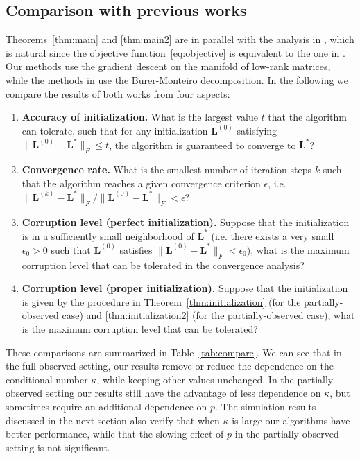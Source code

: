 \documentclass[12pt]{article}
\newcommand{\bL}{\boldsymbol{L}}
\theoremstyle{plain}
\theoremstyle{definition}
\theoremstyle{plain}
\theoremstyle{plain}
\theoremstyle{remark}
\begin{document}


\subsection{Comparison with previous works}\label{sec:compare}
Theorems~\ref{thm:main} and \ref{thm:main2} are in parallel with the analysis in \cite{DBLP:conf/nips/YiPCC16}, which is natural since the objective function~\eqref{eq:objective} is equivalent to the one in \cite{DBLP:conf/nips/YiPCC16}. Our methods use the gradient descent on the manifold of low-rank matrices, while the methods in \cite{DBLP:conf/nips/YiPCC16} use the Burer-Monteiro decomposition. In the following we compare the results of both works from four aspects: 
\begin{enumerate}

\item \textbf{Accuracy of initialization.} What is the largest value $t$ that the algorithm can tolerate, such that for any initialization $\bL^{(0)}$ satisfying $\|\bL^{(0)}-\bL^*\|_F\leq t$, the algorithm is guaranteed to converge to $\bL^*$? 

\item \textbf{Convergence rate.} What is the smallest number of iteration steps $k$ such that the algorithm reaches a given convergence criterion $\epsilon$,  i.e. $\|\bL^{(k)}-\bL^*\|_F/\|\bL^{(0)}-\bL^*\|_F<\epsilon$? 

\item \textbf{Corruption level (perfect initialization).} Suppose that the initialization is in a sufficiently small neighborhood of $\bL^*$ (i.e. there exists a very small $\epsilon_0>0$ such that $\bL^{(0)}$ satisfies $\|\bL^{(0)}-\bL^*\|_F<\epsilon_0$), what is the maximum corruption level that can be tolerated in the convergence analysis?  

\item \textbf{Corruption level (proper initialization).} Suppose that the initialization is given by the procedure in Theorem~\ref{thm:initialization} (for the partially-observed case) and \ref{thm:initialization2} (for the partially-observed case), what is the  maximum corruption level that can be tolerated?
\end{enumerate}

These  comparisons are summarized in Table~\ref{tab:compare}. We can see that in the full observed setting, our results remove or reduce the dependence on the conditional number $\kappa$, while keeping other values unchanged. In the partially-observed setting our results still have the advantage of less dependence on $\kappa$, but sometimes require an additional dependence on $p$. The simulation results discussed in the next section also verify that when $\kappa$ is large our algorithms have better performance, while that the slowing effect of $p$ in the partially-observed setting is not significant. 
\end{document}
